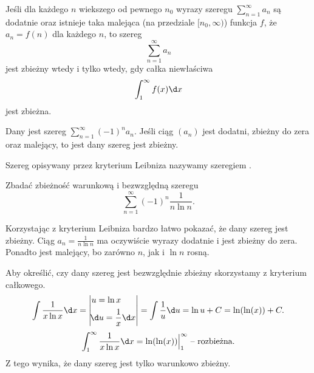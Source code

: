 \begin{theorem}
    Jeśli dla każdego $n$ wiekszego od pewnego $n_0$ wyrazy szeregu $\sum_{n=1}^\infty a_n$ są dodatnie oraz istnieje taka malejąca (na przedziale $[n_0, \infty)$) funkcja $f$, że $a_n = f(n)$ dla każdego $n$, to szereg
    \[ \sum_{n=1}^\infty a_n \]
    jest zbieżny wtedy i tylko wtedy, gdy całka niewłaściwa
    \[ \int_1^\infty f(x) \d x \]
    jest zbieżna.
\end{theorem}

\begin{theorem}
    Dany jest szereg $\sum_{n=1}^\infty (-1)^na_n$. Jeśli ciąg $(a_n)$ jest dodatni, zbieżny do zera oraz malejący, to jest dany szereg jest zbieżny.
\end{theorem}

Szereg opisywany przez kryterium Leibniza nazywamy szeregiem .

\begin{example}
    Zbadać zbieżność warunkową i bezwzględną szeregu
    \[ \sum_{n=1}^\infty (-1)^n \frac{1}{n\ln{n}}. \]
\end{example}
\begin{solution}
    Korzystając z kryterium Leibniza bardzo łatwo pokazać, że dany szereg jest zbieżny. Ciąg $a_n = \frac{1}{n\ln{n}}$ ma oczywiście wyrazy dodatnie i jest zbieżny do zera. Ponadto jest malejący, bo zarówno $n$, jak i $\ln{n}$ rosną.

    Aby określić, czy dany szereg jest bezwzględnie zbieżny skorzystamy z kryterium całkowego.
    \[ \int \frac{1}{x\ln{x}} \d x = \left|\begin{alignedat}{2}&u = \ln{x} \\ &\!\d u = \frac{1}{x} \d x\end{alignedat}\right| = \int \frac{1}{u} \d u = \ln{u} + C = \ln(\ln(x)) + C. \]
    \[ \int_1^\infty \frac{1}{x\ln{x}} \d x = \ln(\ln(x)) \Big|_1^\infty \text{ -- rozbieżna.} \]
    Z tego wynika, że dany szereg jest tylko warunkowo zbieżny.
\end{solution}